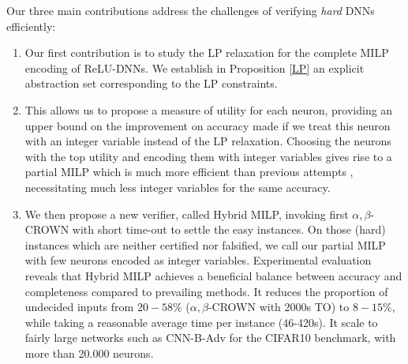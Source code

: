 Our three main contributions address the challenges of verifying {\em hard} DNNs efficiently:
\begin{enumerate}
	\item  Our first contribution is to study the LP relaxation for the complete MILP
	encoding of ReLU-DNNs. We establish in Proposition \ref{LP} an explicit abstraction set corresponding to the LP constraints.
	\item This allows us to propose a measure of utility for each neuron, providing an upper bound on the improvement on accuracy made if we treat this neuron with an integer variable instead of the LP relaxation. Choosing the neurons with the top utility and encoding them with integer variables gives rise to a partial MILP which is much more efficient than previous attempts \cite{DivideAndSlide}, necessitating much less integer variables for the same accuracy.

\item We then propose a new verifier, called Hybrid MILP, invoking first 
$\alpha,\beta$-CROWN with short time-out to settle the easy instances. On those (hard) instances which are neither certified nor falsified, we call our partial MILP with few neurons encoded as integer variables. Experimental evaluation reveals that Hybrid MILP achieves a beneficial balance between accuracy and completeness compared to prevailing methods. It reduces the proportion of undecided inputs from $20-58\%$ ($\alpha,\beta$-CROWN with 2000s TO) to $8-15\%$, while taking a reasonable average time per instance (46-420s). It scale to fairly large networks such as CNN-B-Adv \cite{SDPFI} for the CIFAR10 benchmark, with more than 20.000 neurons.
\end{enumerate}

